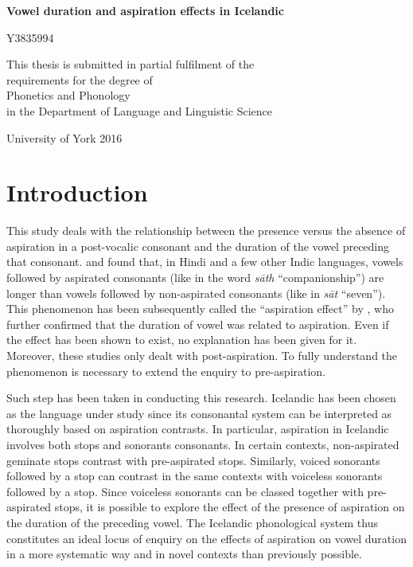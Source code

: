 \documentclass[11pt,a4paper,oneside,openany]{memoir}\usepackage[]{graphicx}\usepackage[]{color}
\newcommand{\titlePage}{
\thispagestyle{empty}%
\vspace{1in}%
\begin{center}
{\Huge \textbf{Vowel duration and aspiration effects in Icelandic}}
\end{center}
\vspace{0.75in}
\begin{center}
{\huge Y3835994} \\
\vspace{1in}

\begin{center}
\begin{minipage}{5in}
\begin{center}
This thesis is submitted in partial fulfilment of the\\
requirements for the degree of\\
Phonetics and Phonology \\
in the Department of Language and Linguistic Science
\end{center}
\end{minipage}
\end{center}

\vfill
University of York
\vspace{0.5in}
\vspace{0.25in}
2016
\end{center}
}
\begin{document}
\begin{titlingpage}
\titlePage
\end{titlingpage}





\frontmatter

\setcounter{page}{2}



\tableofcontents*
\newpage
\listoftables*
\newpage
\listoffigures*




\mainmatter
\setcounter{page}{9}


\chapter{Introduction}
\label{c:introduction}

This study deals with the relationship between the presence versus the absence of aspiration in a post-vocalic consonant and the duration of the vowel preceding that consonant.
\citet{maddieson1976} and \citet{maddieson1976a} found that, in Hindi and a few other Indic languages, vowels followed by aspirated consonants (like in the word \textit{sāth} ``companionship'') are longer than vowels followed by non-aspirated consonants (like in \textit{sāt} ``seven'').
This phenomenon has been subsequently called the ``aspiration effect'' by \citet{durvasula2012}, who further confirmed that the duration of vowel was related to aspiration.
Even if the effect has been shown to exist, no explanation has been given for it.
Moreover, these studies only dealt with post-aspiration.
To fully understand the phenomenon is necessary to extend the enquiry to pre-aspiration.

Such step has been taken in conducting this research.
Icelandic has been chosen as the language under study since its consonantal system can be interpreted as thoroughly based on aspiration contrasts.
In particular, aspiration in Icelandic involves both stops and sonorants consonants.
In certain contexts, non-aspirated geminate stops contrast with pre-aspirated stops.
Similarly, voiced sonorants followed by a stop can contrast in the same contexts with voiceless sonorants followed by a stop.
Since voiceless sonorants can be classed together with pre-aspirated stops, it is possible to explore the effect of the presence of aspiration on the duration of the preceding vowel.
The Icelandic phonological system thus constitutes an ideal locus of enquiry on the effects of aspiration on vowel duration in a more systematic way and in novel contexts than previously possible.
\end{document}
